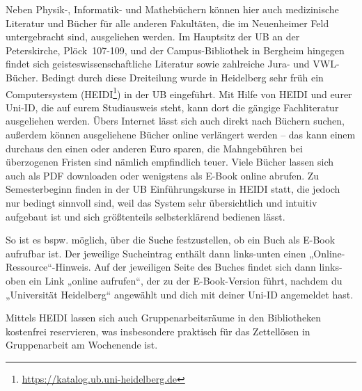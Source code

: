Neben Physik-, Informatik- und Mathebüchern können hier auch medizinische Literatur und Bücher für alle anderen Fakultäten, die im Neuenheimer Feld untergebracht sind, ausgeliehen werden. Im Hauptsitz der \gls{UB} an der Peterskirche, Plöck~107-109, und der Campus-Bibliothek in Bergheim hingegen findet sich geisteswissenschaftliche Literatur sowie zahlreiche Jura- und VWL- Bücher. Bedingt durch diese Dreiteilung wurde in Heidelberg sehr früh ein Computersystem (\gls{HEIDI}\footnote{\url{https://katalog.ub.uni-heidelberg.de}}) in der UB eingeführt. Mit Hilfe von HEIDI und eurer Uni-ID, die auf eurem Studiausweis steht, kann dort die gängige Fachliteratur ausgeliehen werden. Übers Internet lässt sich auch direkt nach Büchern suchen, außerdem können ausgeliehene Bücher online verlängert werden -- das kann einem durchaus den einen oder anderen Euro sparen, die Mahngebühren bei überzogenen Fristen sind nämlich empfindlich teuer. Viele Bücher lassen sich auch als PDF downloaden oder wenigstens als E-Book online abrufen. Zu Semesterbeginn finden in der UB Einführungskurse in HEIDI statt, die jedoch nur bedingt sinnvoll sind, weil das System sehr übersichtlich und intuitiv aufgebaut ist und sich größtenteils selbsterklärend bedienen lässt.

So ist es bspw. möglich, über die Suche festzustellen, ob ein Buch als E-Book aufrufbar ist. Der jeweilige Sucheintrag enthält dann links-unten einen „Online-Ressource“-Hinweis. Auf der jeweiligen Seite des Buches findet sich dann links-oben ein Link „online aufrufen“, der zu der E-Book-Version führt, nachdem du „Universität Heidelberg“ angewählt und dich mit deiner Uni-ID angemeldet hast.

Mittels HEIDI lassen sich auch Gruppenarbeitsräume in den Bibliotheken kostenfrei reservieren, was insbesondere praktisch für das Zettellösen in Gruppenarbeit am Wochenende ist.

